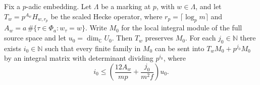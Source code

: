\begin{lemma}
\label{lem:a-mark-single-colength}
\emitthmsource
Fix a $p$-adic embedding. Let $\Lambda$ be a marking at $p$, with $w\in\Lambda$, and let $T_w=p^{A_w}H_{w,r_p}$ be the scaled Hecke operator, where $r_p=\lceil\log_p m\rceil$ and $A_w=a\,\#\{\tau\in\Phi_a:w_\tau=w\}$. Write $M_0$ for the local integral module of the full source space and let $u_0=\dim_{\mathbb C}U_0$. Then $T_w$ preserves $M_0$. For each $j_0\in\mathbb N$ there exists $i_0\in\mathbb N$ such that every finite family in $M_0$ can be sent into $T_wM_0+p^{j_0}M_0$ by an integral matrix with determinant dividing $p^{i_0}$, where
\[
 i_0\le
 \left(\frac{12A_w}{mp}+\frac{j_0}{m^2f}\right)u_0 .
\]
\end{lemma}
